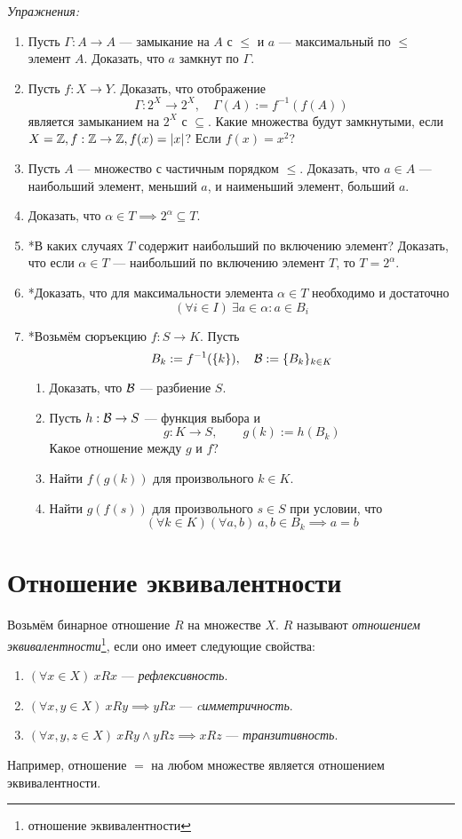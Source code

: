 \vspace{1em}
{\it Упражнения:}
\begin{enumerate}
	\item{}Пусть $\Gamma:A\to A$ --- замыкание на $A$ с $\leq$ и $a$ ---
	максимальный по $\leq$ элемент $A$. Доказать, что $a$ замкнут по $\Gamma$.
	\item{}Пусть $f:X\to Y$. Доказать, что отображение
	\[
		\Gamma:2^{X}\to 2^{X},\quad \Gamma(A):= f^{-1}(f(A))
	\]
	является замыканием на $2^{X}$ с $\subseteq$. Какие множества
	будут замкнутыми, если $X=\mathbb Z,f:\mathbb Z\to \mathbb Z,f(x)=|x|$? Если $f(x)=x^{2}$?
	\item{}Пусть $A$ --- множество с частичным порядком $\leq$.
	Доказать, что $a\in A$ --- наибольший элемент, меньший $a$,
	и наименьший элемент, больший $a$.
	\item{}Доказать, что $\alpha\in T\implies 2^{\alpha}\subseteq T$.
	\item{}*В каких случаях $T$ содержит наибольший по включению элемент?
	Доказать, что если $\alpha\in T$ --- наибольший по включению элемент $T$,
	то $T=2^{\alpha}$.
	\item{}*Доказать, что для максимальности элемента $\alpha\in T$ необходимо
	и достаточно
	\[
		(\forall i\in I)~\exists a\in\alpha:a\in B_{i}
	\]
	\item{}*Возьмём сюръекцию $f:S\to K$. Пусть
	\[
		B_{k}:=f^{-1}(\{k\}),\quad \mathcal B:=\{B_{k}\}_{k\in K}
	\]
	\begin{enumerate}
		\item{}Доказать, что $\mathcal B$ --- разбиение $S$.
		\item{}Пусть $h:\mathcal B\to S$ --- функция выбора и
		\[
			g:K\to S,\qquad g(k):=h(B_{k})
		\]
		Какое отношение между $g$ и $f$?
		\item{}Найти $f(g(k))$ для произвольного $k\in K$.
		\item{}Найти $g(f(s))$ для произвольного $s\in S$ при условии, что
		\[
			(\forall k\in K)(\forall a,b)~a,b\in B_{k}\implies a=b
		\]
	\end{enumerate}
\end{enumerate}

\section{Отношение эквивалентности}

Возьмём бинарное отношение $R$ на множестве $X$. $R$ называют
{\it отношением эквивалентности}\footnote{отношение эквивалентности},
если оно имеет следующие свойства:
\begin{enumerate}
	\item{}$(\forall x\in X)~xRx$ --- {\it рефлексивность}.
	\item{}$(\forall x,y\in X)~xRy\implies yRx$
	--- {\it cимметричность}.
	\item{}$(\forall x,y,z\in X)~xRy\land yRz\implies xRz$ --- {\it транзитивность}.
\end{enumerate}
Например, отношение $=$ на любом множестве является отношением эквивалентности.

